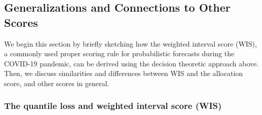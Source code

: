 \documentclass{article}\usepackage[]{graphicx}\usepackage[]{xcolor}
\begin{document}
\subsection{Generalizations and Connections to Other Scores}
\label{sec:methods.related}

We begin this section by briefly sketching how the weighted interval score (WIS), a commonly used proper scoring rule for probabilistic forecasts during the COVID-19 pandemic, can be derived using the decision theoretic approach above. Then, we discuss similarities and differences between WIS and the allocation score, and other scores in general.

\subsubsection{The quantile loss and weighted interval score (WIS)}
\label{sec:methods.wis}
\end{document}
